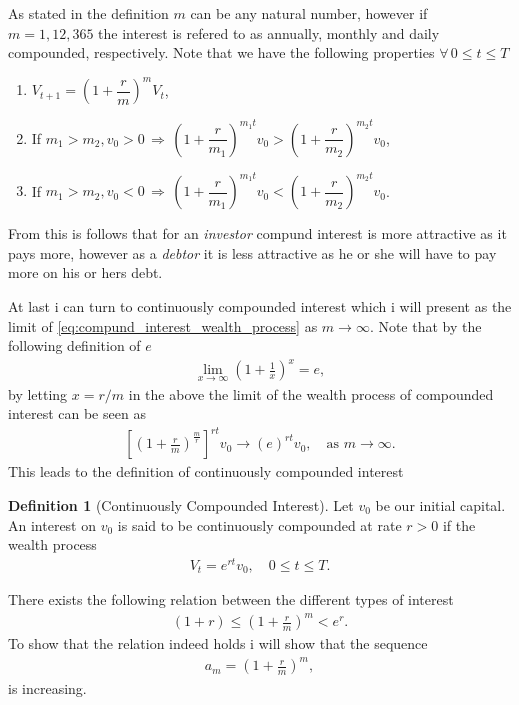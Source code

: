 \documentclass{article}
\theoremstyle{definition}
\newtheorem{definition}[theorem]{Definition}
\numberwithin{equation}{section}
\begin{document}
As stated in the definition $m$ can be any natural number, however if $m = 1, 12, 365$ the interest is refered to as annually, monthly and daily compounded, respectively.
Note that we have the following properties $\forall\, 0 \leq t \leq T$
\begin{enumerate}[label = \textit{\roman*})]
    \item $V_{t + 1} = \left( 1 + \dfrac{r}{m} \right)^{m}V_t$,
    \item If $m_1 > m_2, v_0 > 0 
    \, \Rightarrow \, 
    \left( 1 + \dfrac{r}{m_1} \right)^{m_1t}v_0
    >
    \left( 1 + \dfrac{r}{m_2} \right)^{m_2t}v_0$,
    \item If $m_1 > m_2, v_0 < 0 
    \, \Rightarrow \, 
    \left( 1 + \dfrac{r}{m_1} \right)^{m_1t}v_0
    <
    \left( 1 + \dfrac{r}{m_2} \right)^{m_2t}v_0$.
\end{enumerate}
From this is follows that for an \textit{investor} compund interest is more attractive as it pays more, however as a \textit{debtor} it is less attractive as he or she will have to pay more on his or hers debt.

At last i can turn to continuously compounded interest which i will present as the limit of \eqref{eq:compund_interest_wealth_process} as $m \rightarrow \infty$.
Note that by the following definition of $e$
\begin{align}
    \lim_{x \rightarrow \infty} \left(1 + \frac{1}{x}\right)^x = e,
\end{align}
by letting $x = r/m$ in the above the limit of the wealth process of compounded interest can be seen as
\begin{align}
    \left[\left( 1 + \frac{r}{m} \right)^\frac{m}{r}\right]^{rt}v_0 \rightarrow
    (e)^{rt}v_0, \quad \text{as } m \rightarrow \infty.
\end{align} 
This leads to the definition of continuously compounded interest
\begin{definition}[Continuously Compounded Interest]
    Let $v_0$ be our initial capital.
    An interest on $v_0$ is said to be continuously compounded at rate $r>0$ if the wealth process
    \begin{align}
        V_t = e^{rt}v_0, \quad 0 \leq t \leq T.
    \end{align}
\end{definition}
There exists the following relation between the different types of interest
\begin{align}
    (1 + r) \leq \left(1 + \frac{r}{m}\right)^m < e^r.
\end{align}
To show that the relation indeed holds i will show that the sequence
\begin{align}
    a_m = \left(1 + \frac{r}{m}\right)^m,
\end{align}
is increasing.
\end{document}
